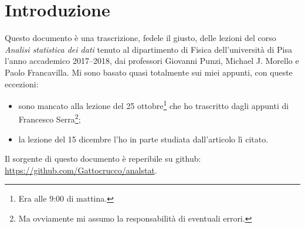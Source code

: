 
\chapter*{Introduzione}

Questo documento è una trascrizione, fedele il giusto,
delle lezioni del corso \emph{Analisi statistica dei dati}
tenuto al dipartimento di Fisica dell'università di Pisa
l'anno accademico 2017--2018,
dai professori Giovanni Punzi, Michael J. Morello e Paolo Francavilla.
Mi sono basato quasi totalmente sui miei appunti,
con queste eccezioni:
\begin{itemize}
	\item sono mancato alla lezione del 25 ottobre\footnote{Era alle 9:00 di mattina.} che ho trascritto dagli appunti di Francesco Serra\footnote{Ma ovviamente mi assumo la responsabilità di eventuali errori.};
	\item la lezione del 15 dicembre l'ho in parte studiata dall'articolo lì citato.
\end{itemize}
Il sorgente di questo documento è reperibile su github:\\
\url{https://github.com/Gattocrucco/analstat}.
